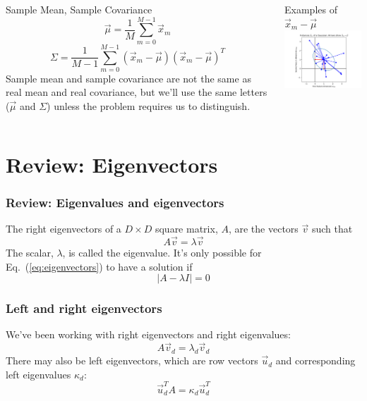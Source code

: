 \documentclass{beamer}
\begin{document}
\begin{frame}
  \begin{columns}
    \column{2.25in}
    \begin{block}{Sample Mean, Sample Covariance}
      \[
      \vec\mu=\frac{1}{M}\sum_{m=0}^{M-1}\vec{x}_m
      \]
      \[
      \Sigma=\frac{1}{M-1}\sum_{m=0}^{M-1}(\vec{x}_m-\vec\mu)(\vec{x}_m-\vec\mu)^T
      \]
      Sample mean and sample covariance are not the same as real mean
      and real covariance, but we'll use the same letters ($\vec\mu$
      and $\Sigma$) unless the problem requires us to distinguish.
    \end{block}
    \column{2in}
    \begin{block}{Examples of $\vec{x}_m-\vec\mu$}
      \includegraphics[width=1.9in]{gaussian_subtraction.png}
    \end{block}
  \end{columns}
\end{frame}

\section[Eigenvectors]{Review: Eigenvectors}
\setcounter{subsection}{1}


\begin{frame}
  \frametitle{Review: Eigenvalues and eigenvectors}
  The right eigenvectors of a $D\times D$ square matrix, $A$, are the
  vectors $\vec{v}$ such that
  \begin{equation}
    A\vec{v}=\lambda\vec{v}
    \label{eq:eigenvectors}
  \end{equation}
  The scalar, $\lambda$, is called the eigenvalue.  It's only possible
  for Eq.~(\ref{eq:eigenvectors}) to have a solution if
  \begin{equation}
    |A-\lambda I|=0
    \label{eq:eigenvalues}
  \end{equation}
\end{frame}

\begin{frame}
  \frametitle{Left and right eigenvectors}
  We’ve been working with right eigenvectors and right eigenvalues: 
  \[
  A\vec{v}_d =\lambda_d\vec{v}_d
  \]
  There may also be left eigenvectors, which are row vectors $\vec{u}_d$
  and corresponding left eigenvalues $\kappa_d$:
  \[
  \vec{u}_d^T A = \kappa_d\vec{u}_d^T
  \]
\end{frame}
\end{document}
